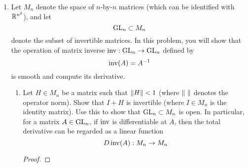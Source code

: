 \documentclass[../psets.tex]{subfiles}
\begin{document}
\begin{enumerate}
\begin{enumerate}
\begin{proof}
            We have that
            \begin{align*}
                {\pdv{f}{x}{y}}(0,0) &= \eval{\pdv{x}(\pdv{f}{y})}_{(0,0)}&
                    {\pdv{f}{y}{x}}(0,0) &= \eval{\pdv{y}(\pdv{f}{x})}_{(0,0)}\\
                &= \lim_{h\to 0}\frac{\eval{\pdv{f}{y}}_{(h,0)}-\eval{\pdv{f}{y}}_{(0,0)}}{h}&
                    &= \lim_{h\to 0}\frac{\eval{\pdv{f}{x}}_{(0,h)}-\eval{\pdv{f}{y}}_{(0,0)}}{h}\\
                &= \lim_{h\to 0}\frac{\frac{h(h^4-4h^20^2-0^4)}{(h^2+0^2)^2})-0}{h}&
                    &= \lim_{h\to 0}\frac{\frac{h(0^4+40^2h^2-h^4)}{(0^2+h^2)^2}-0}{h}\\
                &= \lim_{h\to 0}1&
                    &= \lim_{h\to 0}-1\\
                &= 1&
                    &= -1
            \end{align*}
            so that
            \begin{equation*}
                {\pdv[2]{f}{x}{y}}(0,0) = 1 \neq -1 = {\pdv[2]{f}{y}{x}}(0,0)
            \end{equation*}
            as desired.
        \end{proof}
    \end{enumerate}
    \item Let $M_n$ denote the space of $n$-by-$n$ matrices (which can be identified with $\mathbb{R}^{n^2}$), and let
    \begin{equation*}
        \text{GL}_{n} \subset M_n
    \end{equation*}
    denote the subset of invertible matrices. In this problem, you will show that the operation of matrix inverse $\operatorname{inv}:\text{GL}_{n}\to\text{GL}_{n}$ defined by
    \begin{equation*}
        \operatorname{inv}(A) = A^{-1}
    \end{equation*}
    is smooth and compute its derivative.
    \begin{enumerate}
        \item Let $H\in M_n$ be a matrix such that $\norm{H}<1$ (where $\norm{\ }$ denotes the operator norm). Show that $I+H$ is invertible (where $I\in M_n$ is the identity matrix). Use this to show that $\text{GL}_{n}\subset M_n$ is open. In particular, for a matrix $A\in\text{GL}_{n}$, if $\operatorname{inv}$ is differentiable at $A$, then the total derivative can be regarded as a linear function
        \begin{equation*}
            D\operatorname{inv}(A):M_n\to M_n
        \end{equation*}
        \begin{proof}


\end{proof}
\end{enumerate}
\end{enumerate}
\end{document}
